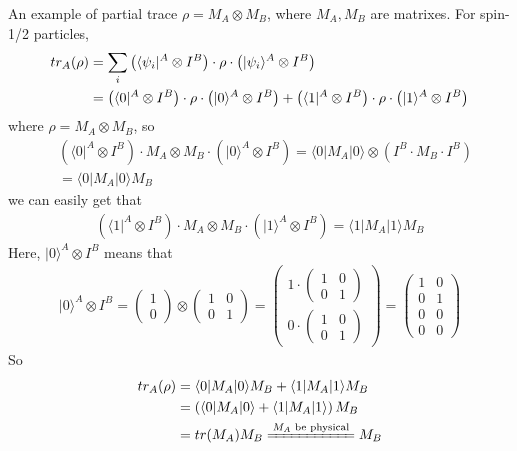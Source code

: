 \documentclass[UTF8,12pt]{article} %
\begin{document}
\begin{myboxes}{An example of partial trace}{}
$\rho = M_{A} \otimes M_{B}$, where $M_{A}, M_{B}$ are matrixes. For spin-1/2 particles,
\begin{align}
tr_{A}(\rho) &= \sum_{i} \left(\langle\psi_{i}|^{A} \otimes I^{B}\right) \cdot \rho \cdot \left(|\psi_{i}\rangle^{A} \otimes I^{B}\right) \notag\\
&= \left(\langle0|^{A} \otimes I^{B}\right) \cdot \rho \cdot \left(|0\rangle^{A} \otimes I^{B}\right) + \left(\langle1|^{A} \otimes I^{B}\right) \cdot \rho \cdot \left(|1\rangle^{A} \otimes I^{B}\right)
\end{align}
where $\rho = M_{A} \otimes M_{B}$, so
\begin{align}
&\left(\langle0|^{A} \otimes I^{B}\right) \cdot M_{A} \otimes M_{B} \cdot \left(|0\rangle^{A} \otimes I^{B}\right) = \langle0|M_{A}|0\rangle \otimes \left(I^{B}\cdot M_{B} \cdot I^{B}\right)\\
&= \langle0|M_{A}|0\rangle M_{B}
\end{align}
we can easily get that
\begin{align}
\left(\langle1|^{A} \otimes I^{B}\right) \cdot M_{A} \otimes M_{B} \cdot \left(|1\rangle^{A} \otimes I^{B}\right) = \langle1|M_{A}|1\rangle M_{B}
\end{align}
Here, $|0\rangle^{A} \otimes I^{B}$ means that
\begin{align}
|0\rangle^{A} \otimes I^{B} = \begin{pmatrix}1\\0\end{pmatrix} \otimes \begin{pmatrix}1&0\\0&1\end{pmatrix} = \begin{pmatrix}1\cdot\begin{pmatrix}1&0\\0&1\end{pmatrix}\\0\cdot\begin{pmatrix}1&0\\0&1\end{pmatrix}\end{pmatrix} = \begin{pmatrix}1&0\\0&1\\0&0\\0&0\end{pmatrix}
\end{align}
So
\begin{align}
tr_{A}(\rho) &= \langle0|M_{A}|0\rangle M_{B} + \langle1|M_{A}|1\rangle M_{B} \\
&= \left(\langle0|M_{A}|0\rangle + \langle1|M_{A}|1\rangle\right) M_{B} \\
&= tr(M_{A}) M_{B} \xlongequal{M_{A}\text{ be physical}} M_{B}
\end{align}
\end{myboxes}
\end{document}
